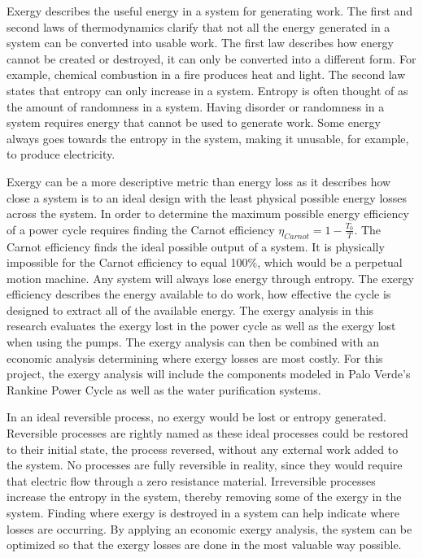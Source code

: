 Exergy describes the useful energy in a system for generating work. The first and second laws of thermodynamics clarify that not all the energy generated in a system can be converted into usable work.  The first law describes how energy cannot be created or destroyed, it can only be converted into a different form.  For example, chemical combustion in a fire produces heat and light. The second law states that entropy can only increase in a system. Entropy is often thought of as the amount of randomness in a system.  Having disorder or randomness in a system requires energy that cannot be used to generate work. Some energy always goes towards the entropy in the system, making it unusable, for example, to produce electricity. 


Exergy can be a more descriptive metric than energy loss as it describes how close a system is to an ideal design with the least physical possible energy losses across the system. In order to determine the maximum possible energy efficiency of a power cycle requires finding the Carnot efficiency $\eta_{Carnot}=1-\frac{T_0}{T}$. The Carnot efficiency finds the ideal possible output of a system. It is physically impossible for the Carnot efficiency to equal 100\%, which would be a perpetual motion machine.  Any system will always lose energy through entropy. The exergy efficiency describes the energy available to do work, how effective the cycle is designed to extract all of the available energy. The exergy analysis in this research evaluates the exergy lost in the power cycle as well as the exergy lost when using the pumps. The exergy analysis can then be combined with an economic analysis determining where exergy losses are most costly. For this project, the exergy analysis will include the components modeled in Palo Verde's Rankine Power Cycle as well as the water purification systems.

In an ideal reversible process, no exergy would be lost or entropy generated. Reversible processes are rightly named as these ideal processes could be restored to their initial state, the process reversed, without any external work added to the system. No processes are fully reversible in reality, since they would require that electric flow through a zero resistance material. Irreversible processes increase the entropy in the system, thereby removing some of the exergy in the system. Finding where exergy is destroyed in a system can help indicate where losses are occurring. By applying an economic exergy analysis, the system can be optimized so that the exergy losses are done in the most valuable way possible.
% 
% 
%

